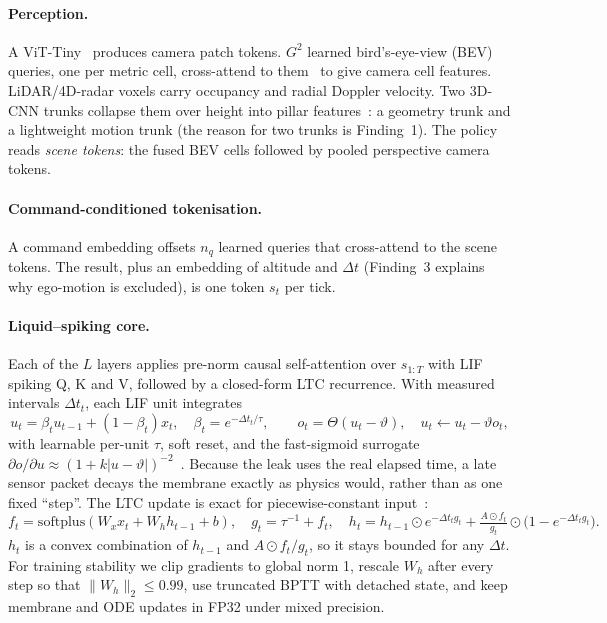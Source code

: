 \documentclass[12pt]{article}
\begin{document}
\paragraph{Perception.} A ViT-Tiny~\citep{dosovitskiy2021vit} produces camera patch tokens. $G^2$ learned bird's-eye-view (BEV) queries, one per metric cell, cross-attend to them~\citep{li2022bevformer} to give camera cell features. LiDAR/4D-radar voxels carry occupancy and radial Doppler velocity. Two 3D-CNN trunks collapse them over height into pillar features~\citep{lang2019pointpillars}: a geometry trunk and a lightweight motion trunk (the reason for two trunks is Finding~1). The policy reads \emph{scene tokens}: the fused BEV cells followed by pooled perspective camera tokens.

\paragraph{Command-conditioned tokenisation.} A command embedding offsets $n_q$ learned queries that cross-attend to the scene tokens. The result, plus an embedding of altitude and $\Delta t$ (Finding~3 explains why ego-motion is excluded), is one token $s_t$ per tick.

\paragraph{Liquid--spiking core.} Each of the $L$ layers applies pre-norm causal self-attention over $s_{1:T}$ with LIF spiking Q, K and V, followed by a closed-form LTC recurrence. With measured intervals $\Delta t_t$, each LIF unit integrates
\begin{equation}
u_t=\beta_t u_{t-1}+(1-\beta_t)x_t,\quad \beta_t=e^{-\Delta t_t/\tau},\qquad o_t=\Theta(u_t-\vartheta),\quad u_t\leftarrow u_t-\vartheta o_t ,
\label{eq:lif}
\end{equation}
with learnable per-unit $\tau$, soft reset, and the fast-sigmoid surrogate $\partial o/\partial u\approx(1+k|u-\vartheta|)^{-2}$~\citep{zenke2018superspike}. Because the leak uses the real elapsed time, a late sensor packet decays the membrane exactly as physics would, rather than as one fixed ``step''. The LTC update is exact for piecewise-constant input~\citep{hasani2022cfc}:
\begin{equation}
f_t=\mathrm{softplus}(W_x x_t+W_h h_{t-1}+b),\quad g_t=\tau^{-1}+f_t,\quad
h_t=h_{t-1}\odot e^{-\Delta t_t g_t}+\tfrac{A\odot f_t}{g_t}\odot\big(1-e^{-\Delta t_t g_t}\big).
\label{eq:ltc}
\end{equation}
$h_t$ is a convex combination of $h_{t-1}$ and $A\odot f_t/g_t$, so it stays bounded for any $\Delta t$. For training stability we clip gradients to global norm 1, rescale $W_h$ after every step so that $\lVert W_h\rVert_2\le0.99$, use truncated BPTT with detached state, and keep membrane and ODE updates in FP32 under mixed precision.
\end{document}
